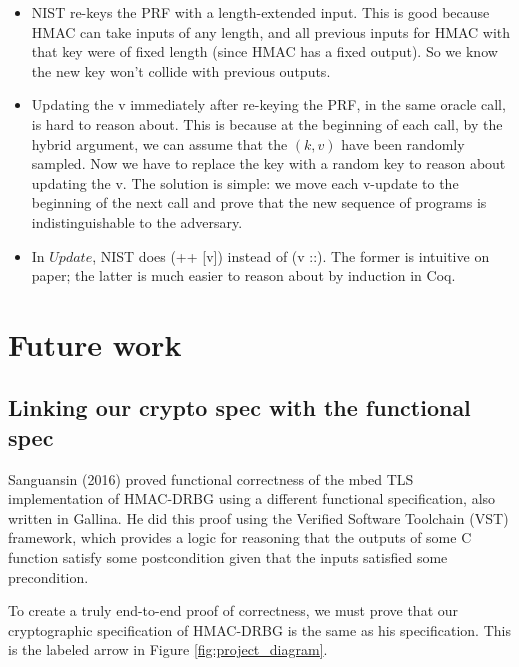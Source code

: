 \documentclass[12pt,lot, lof]{puthesis}
\newcommand{\kv} {$(k, v)$ }
\begin{document}
{\begin{itemize}
\item NIST re-keys the PRF with a length-extended input. This is good because HMAC can take inputs of any length, and all previous inputs for HMAC with that key were of fixed length (since HMAC has a fixed output). So we know the new key won't collide with previous outputs.
\item Updating the v immediately after re-keying the PRF, in the same oracle call, is hard to reason about. This is because at the beginning of each call, by the hybrid argument, we can assume that the \kv have been randomly sampled. Now we have to replace the key with a random key to reason about updating the v. The solution is simple: we move each v-update to the beginning of the next call and prove that the new sequence of programs is indistinguishable to the adversary.
\item In $Update$, NIST does (++ [v]) instead of (v ::). The former is intuitive on paper; the latter is much easier to reason about by induction in Coq.
\end{itemize}

\chapter{Future work}
\section{Linking our crypto spec with the functional spec}

Sanguansin (2016) proved functional correctness of the mbed TLS implementation of HMAC-DRBG using a different functional specification, also written in Gallina. He did this proof using the Verified Software Toolchain (VST) framework, which provides a logic for reasoning that the outputs of some C function satisfy some postcondition given that the inputs satisfied some precondition.

To create a truly end-to-end proof of correctness, we must prove that our cryptographic specification of HMAC-DRBG is the same as his specification. This is the labeled arrow in Figure \ref{fig:project_diagram}.

}
\end{document}
